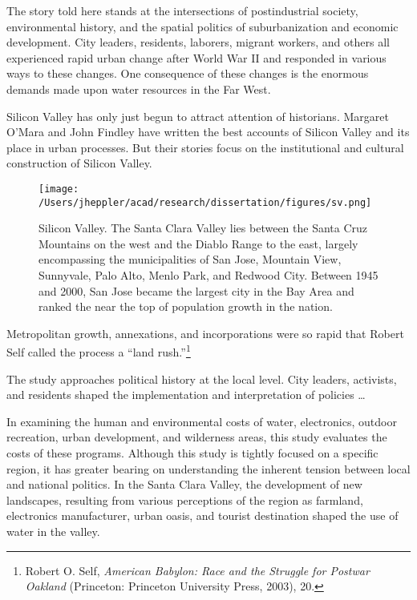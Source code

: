 \documentclass[11pt,article,oneside]{memoir}
\makeatletter
\def\maxwidth{\ifdim\Gin@nat@width>\linewidth\linewidth
\else\Gin@nat@width\fi}
\let\Oldincludegraphics\includegraphics
\renewcommand{\includegraphics}[1]{\Oldincludegraphics[width=\maxwidth]{#1}}
\makeatother
\begin{document}
The story told here stands at the intersections of postindustrial
society, environmental history, and the spatial politics of
suburbanization and economic development. City leaders, residents,
laborers, migrant workers, and others all experienced rapid urban change
after World War II and responded in various ways to these changes. One
consequence of these changes is the enormous demands made upon water
resources in the Far West.

Silicon Valley has only just begun to attract attention of historians.
Margaret O'Mara and John Findley have written the best accounts of
Silicon Valley and its place in urban processes. But their stories focus
on the institutional and cultural construction of Silicon Valley.

\begin{figure}[htbp]
\centering
\texttt{[image: /Users/jheppler/acad/research/dissertation/figures/sv.png]}
\caption{Silicon Valley. The Santa Clara Valley lies between the Santa
Cruz Mountains on the west and the Diablo Range to the east, largely
encompassing the municipalities of San Jose, Mountain View, Sunnyvale,
Palo Alto, Menlo Park, and Redwood City. Between 1945 and 2000, San Jose
became the largest city in the Bay Area and ranked the near the top of
population growth in the nation.}
\end{figure}

Metropolitan growth, annexations, and incorporations were so rapid that
Robert Self called the process a ``land rush.''\footnote{Robert O. Self,
  \emph{American Babylon: Race and the Struggle for Postwar Oakland}
  (Princeton: Princeton University Press, 2003), 20.}

The study approaches political history at the local level. City leaders,
activists, and residents shaped the implementation and interpretation of
policies \ldots{}

In examining the human and environmental costs of water, electronics,
outdoor recreation, urban development, and wilderness areas, this study
evaluates the costs of these programs. Although this study is tightly
focused on a specific region, it has greater bearing on understanding
the inherent tension between local and national politics. In the Santa
Clara Valley, the development of new landscapes, resulting from various
perceptions of the region as farmland, electronics manufacturer, urban
oasis, and tourist destination shaped the use of water in the valley.
\end{document}
